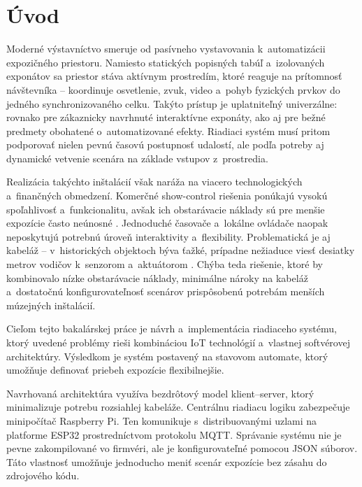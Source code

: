 \chapter{Úvod}

Moderné výstavníctvo smeruje od pasívneho vystavovania
k~automatizácii expozičného priestoru. Namiesto statických
popisných tabúľ a~izolovaných exponátov sa priestor stáva aktívnym
prostredím, ktoré reaguje na prítomnosť návštevníka --
koordinuje osvetlenie, zvuk, video a~pohyb fyzických prvkov
do jedného synchronizovaného celku. Takýto prístup je
uplatniteľný univerzálne: rovnako pre zákaznicky navrhnuté
interaktívne exponáty, ako aj pre bežné predmety obohatené
o~automatizované efekty. Riadiaci systém musí pritom
podporovať nielen pevnú časovú postupnosť udalostí, ale
podľa potreby aj dynamické vetvenie scenára na základe
vstupov z~prostredia.

Realizácia takýchto inštalácií však naráža na viacero
technologických a~finančných obmedzení. Komerčné show-control
riešenia ponúkajú vysokú spoľahlivosť a~funkcionalitu, avšak
ich obstarávacie náklady sú pre menšie expozície často
neúnosné \cite{interactive_small_museums}. Jednoduché časovače
a~lokálne ovládače naopak neposkytujú potrebnú úroveň
interaktivity a~flexibility. Problematická je aj kabeláž
-- v~historických objektoch býva ťažké, prípadne nežiaduce
viesť desiatky metrov vodičov k~senzorom
a~aktuátorom \cite{zonta2010wireless}.
Chýba teda riešenie, ktoré by kombinovalo nízke obstarávacie
náklady, minimálne nároky na kabeláž a~dostatočnú konfigurovateľnosť
scenárov prispôsobenú potrebám menších múzejných inštalácií.

Cieľom tejto bakalárskej práce je návrh a~implementácia
riadiaceho systému, ktorý uvedené problémy rieši kombináciou
IoT technológií a~vlastnej softvérovej architektúry. Výsledkom
je systém postavený na stavovom automate, ktorý umožňuje
definovať priebeh expozície flexibilnejšie.

Navrhovaná architektúra využíva bezdrôtový model klient--server,
ktorý minimalizuje potrebu rozsiahlej kabeláže. Centrálnu
riadiacu logiku zabezpečuje minipočítač Raspberry Pi. Ten
komunikuje s~distribuovanými uzlami na platforme ESP32
prostredníctvom protokolu MQTT. Správanie systému nie je pevne
zakompilované vo firmvéri, ale je konfigurovateľné pomocou
JSON súborov. Táto vlastnosť umožňuje jednoducho meniť scenár
expozície bez zásahu do zdrojového kódu.

